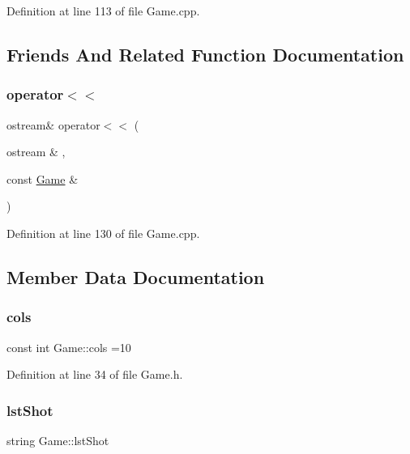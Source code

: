Definition at line 113 of file Game.\+cpp.



\subsection{Friends And Related Function Documentation}
\mbox{\label{class_game_a7bb9176e07b6f6c73c930dba6400265f}} 
\subsubsection{\texorpdfstring{operator$<$$<$}{operator<<}}
{\footnotesize\ttfamily ostream\& operator$<$$<$ (\begin{DoxyParamCaption}\item[{ostream \&}]{,  }\item[{const \hyperlink{class_game}{Game} \&}]{ }\end{DoxyParamCaption})\hspace{0.3cm}{\ttfamily [friend]}}



Definition at line 130 of file Game.\+cpp.



\subsection{Member Data Documentation}
\mbox{\label{class_game_a11dd2c238611d9080277e9766b48c772}} 
\subsubsection{\texorpdfstring{cols}{cols}}
{\footnotesize\ttfamily const int Game\+::cols =10\hspace{0.3cm}{\ttfamily [protected]}}



Definition at line 34 of file Game.\+h.

\mbox{\label{class_game_afd1843aa37acf5d5c33cc7eeb1ffe88f}} 
\subsubsection{\texorpdfstring{lst\+Shot}{lstShot}}
{\footnotesize\ttfamily string Game\+::lst\+Shot\hspace{0.3cm}{\ttfamily [protected]}}



